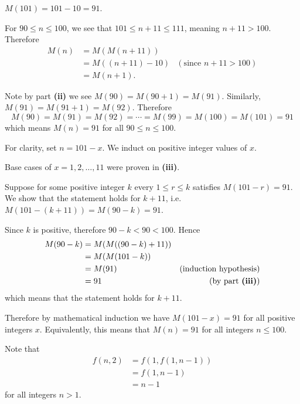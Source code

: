 \begin{questions}
    \item \begin{partquestions}{\roman*}
        \item $M(101) = 101 - 10 = 91$.

        \item For $90 \leq n \leq 100$, we see that $101 \leq n+11 \leq 111$, meaning $n+11 > 100$. Therefore
        \begin{align*}
            M(n) &= M(M(n+11))\\
            &= M((n+11) - 10) & (\text{since } n+11 > 100)\\
            &= M(n+1).
        \end{align*}

        \item Note by part \textbf{(ii)} we see $M(90) = M(90 + 1) = M(91)$. Similarly, $M(91) = M(91 + 1) = M(92)$. Therefore
        \[
            M(90) = M(91) = M(92) = \cdots = M(99) = M(100) = M(101) = 91
        \]
        which means $M(n) = 91$ for all $90 \leq n \leq 100$.

        \item For clarity, set $n = 101 - x$. We induct on positive integer values of $x$.

        Base cases of $x = 1, 2, \dots, 11$ were proven in \textbf{(iii)}.

        Suppose for some positive integer $k$ every $1 \leq r \leq k$ satisfies $M(101 - r) = 91$. We show that the statement holds for $k + 11$, i.e. $M(101 - (k+11)) = M(90 - k) = 91$.

        Since $k$ is positive, therefore $90 - k < 90 < 100$. Hence
        \begin{align*}
            M(90 - k) &= M(M((90 - k) + 11))\\
            &= M(M(101 - k))\\
            &= M(91) & (\text{induction hypothesis})\\
            &= 91 & (\text{by part \textbf{(iii)}})
        \end{align*}
        which means that the statement holds for $k + 11$.

        Therefore by mathematical induction we have $M(101 - x) = 91$ for all positive integers $x$. Equivalently, this means that $M(n) = 91$ for all integers $n \leq 100$.
    \end{partquestions}

    \item \begin{partquestions}{\roman*}
        \item Note that
        \begin{align*}
            f(n,2) &= f(1, f(1, n-1))\\
            &= f(1, n-1)\\
            &= n-1
        \end{align*}
        for all integers $n > 1$.


\end{partquestions}
\end{questions}
